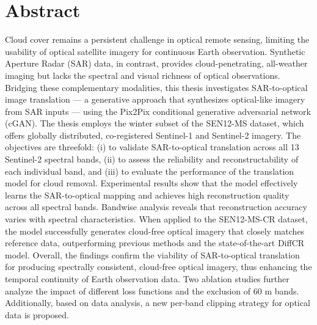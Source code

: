 \chapter*{Abstract}
Cloud cover remains a persistent challenge in optical remote sensing, limiting the usability of optical satellite imagery for continuous Earth observation. Synthetic Aperture Radar (SAR) data, in contrast, provides cloud-penetrating, all-weather imaging but lacks the spectral and visual richness of optical observations. Bridging these complementary modalities, this thesis investigates SAR-to-optical image translation — a generative approach that synthesizes optical-like imagery from SAR inputs — using the Pix2Pix conditional generative adversarial network (cGAN).
The thesis employs the winter subset of the SEN12-MS dataset, which offers globally distributed, co-registered Sentinel-1 and Sentinel-2 imagery. The objectives are threefold: (i) to validate SAR-to-optical translation across all 13 Sentinel-2 spectral bands, (ii) to assess the reliability and reconstructability of each individual band, and (iii) to evaluate the performance of the translation model for cloud removal.
Experimental results show that the model effectively learns the SAR-to-optical mapping and achieves high reconstruction quality across all spectral bands. Bandwise analysis reveals that reconstruction accuracy varies with spectral characteristics. When applied to the SEN12-MS-CR dataset, the model successfully generates cloud-free optical imagery that closely matches reference data, outperforming previous methods and the state-of-the-art DiffCR model.
Overall, the findings confirm the viability of SAR-to-optical translation for producing spectrally consistent, cloud-free optical imagery, thus enhancing the temporal continuity of Earth observation data. Two ablation studies further analyze the impact of different loss functions and the exclusion of 60 m bands. Additionally, based on data analysis, a new per-band clipping strategy for optical data is proposed.